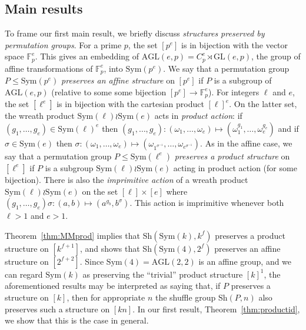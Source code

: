 \documentclass[12pt]{amsart}
\theoremstyle{remark}
\theoremstyle{definition}
\newcommand{\sym}{\mathrm{Sym}}
\newcommand{\sh}{\mathrm{Sh}}
\newcommand{\GL}{\mathrm{GL}}
\newcommand{\AGL}{\mathrm{AGL}}
\begin{document}
\subsection{Main results}
 
To frame our first main result, we briefly discuss \emph{structures preserved by permutation groups}. For a prime $p$, the set $[p^e]$ is in bijection with the vector space $ \mathbb F_p^e$. This gives an embedding of $\AGL(e,p) = C_p^e \rtimes \GL(e,p)$, the group of affine transformations of $ \mathbb F_p^e$, into $\sym(p^e)$. We say that a  permutation group $P\leqslant \sym(p^e)$ \emph{preserves an affine structure} on $[p^e]$ if $P$ is   a subgroup of $\AGL(e,p)$ (relative to some some bijection $[p^e]\rightarrow \mathbb{F}_p^e$). For integers $\ell$ and $e$, the set $[\ell^e]$ is in bijection with the cartesian product $[\ell]^e$. On the latter set, the wreath product $\sym(\ell) \wr \sym(e)$ acts in \emph{product action}: if $(g_1,\dots,g_e)\in \sym(\ell)^e$ then $(g_1,\dots,g_e) : (\omega_1,\dots,\omega_e) \mapsto (\omega_1^{g_1},\dots,\omega_e^{g_e})$ and if $\sigma \in \sym(e)$ then $
\sigma : (\omega_1,\dots,\omega_e) \mapsto (\omega_{1^{\sigma^{-1}}},\dots,\omega_{e^{\sigma^{-1}}}).$ As in the affine case, we say that a permutation group $P \leqslant \sym(\ell^e)$ \emph{preserves a product structure} on $[\ell^e]$ if $P$ is   a subgroup $\sym(\ell) \wr \sym(e)$ acting in product action (for some bijection). There is also  the \emph{imprimitive action} of a wreath product $\sym(\ell) \wr \sym(e)$ on the set $[\ell] \times [e]$ where $(g_1,\dots,g_e)\sigma : (a,b) \mapsto (a^{g_b},b^\sigma)$. This action is imprimitive whenever both $\ell > 1$ and $e>1$.
 
 Theorem~\ref{thm:MMprod} implies that $\sh(\sym(k),k^f)$ preserves a product structure on $[k^{f+1}]$, and \cite[Theorem 2.6]{CHMW} shows that $\sh(\sym(4),2^f)$ preserves an affine structure on $[2^{f+2}]$.   Since $\sym(4)= \mathrm{AGL}(2,2)$ is an affine group, and we can regard $\sym(k)$ as preserving the ``trivial'' product structure  $[k]^1$,  the aforementioned results may be interpreted as saying that, if $P$ preserves a structure on $[k]$, then for appropriate $n$ the shuffle group $\sh(P,n)$ also preserves such a structure on $[kn]$.  In our first result, Theorem~\ref{thm:productid}, we show that this is the case in general. 
 
 
\end{document}

